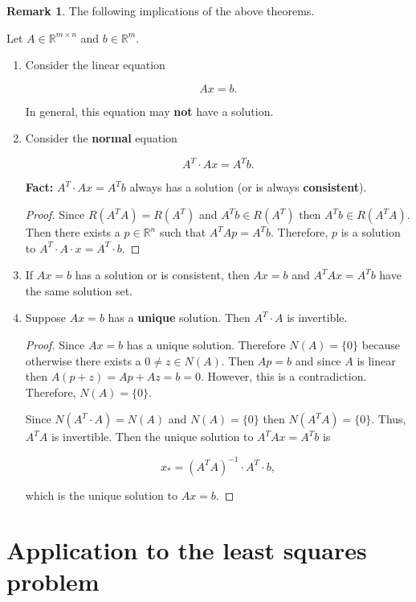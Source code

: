 \documentclass[12pt]{article}
\theoremstyle{definition}
\newtheorem*{remark}{Remark}
\begin{document}
\begin{remark} The following implications of the above theorems.

Let $A \in \mathbb{R}^{m \times n}$ and $b \in \mathbb{R}^m$.

\begin{enumerate}[label = (\arabic*)]
\item Consider the linear equation

\[ Ax = b. \]

In general, this equation may \textbf{not} have a solution.

\item Consider the \textbf{normal} equation

\[A^T \cdot A x = A^T b. \]

\textbf{Fact:} $A^T \cdot A x = A^T b$ always has a solution (or is always
\textbf{consistent}).

\begin{proof}
Since $R(A^T A) = R(A^T)$ and $A^T b \in R(A^T)$ then $A^Tb \in R(A^T A)$. Then
there exists a $p \in \mathbb{R}^n$ such that $A^T A p = A^T b$. Therefore,
$p$ is a solution to $A^T \cdot A \cdot x = A^T \cdot b$.
\end{proof}


\item If $Ax = b$ has a solution or is consistent, then $Ax = b$ and $A^T A x = A^T b$ have
the same solution set.

\item Suppose $Ax = b$ has a \textbf{unique} solution. Then $A^T \cdot A$ is invertible.

\begin{proof}
Since $Ax = b$ has a unique solution. Therefore $N(A) = \{0\}$ because otherwise
there exists a $0 \neq z \in N(A)$. Then $Ap = b$ and since $A$ is linear then
$A(p + z) = Ap + Az = b = 0$. However, this is a contradiction. Therefore,
$N(A) = \{0\}$.

Since $N(A^T \cdot A) = N(A)$ and $N(A) = \{0\}$ then $N(A^T A) = \{0\}$. Thus,
$A^T A$ is invertible. Then the unique solution to $A^T A x = A^T b$ is

\[x_{*} = (A^T A)^{-1} \cdot A^T \cdot b,\]

which is the unique solution to $Ax = b$.
\end{proof}
\end{enumerate}
\end{remark}

\section{Application to the least squares problem}
\end{document}
